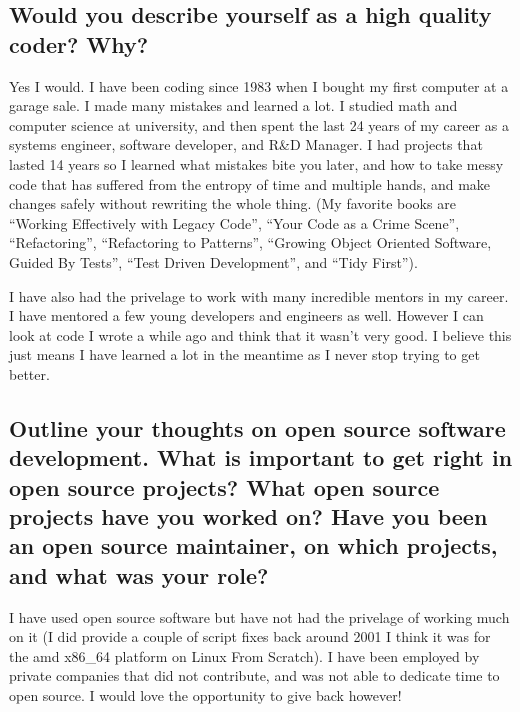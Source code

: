 \documentclass[letter,12pt]{article}
\begin{document}
\subsection{Would you describe yourself as a high quality coder? Why?}
Yes I would. I have been coding since 1983 when I bought my first computer at a garage sale. I made many mistakes and learned a lot. I studied math and computer science at university, and then spent the last 24 years of my career as a systems engineer, software developer, and R\&D Manager. I had projects that lasted 14 years so I learned what mistakes bite you later, and how to take messy code that has suffered from the entropy of time and multiple hands, and make changes safely without rewriting the whole thing. (My favorite books are ``Working Effectively with Legacy Code'', ``Your Code as a Crime Scene'', ``Refactoring'', ``Refactoring to Patterns'', ``Growing Object Oriented Software, Guided By Tests'', ``Test Driven Development'', and ``Tidy First'').

I have also had the privelage to work with many incredible mentors in my career. I have mentored a few young developers and engineers as well. However I can look at code I wrote a while ago and think that it wasn't very good. I believe this just means I have learned a lot in the meantime as I never stop trying to get better.

\subsection{Outline your thoughts on open source software development. What is important to get right in open source projects? What open source projects have you worked on? Have you been an open source maintainer, on which projects, and what was your role?}
I have used open source software but have not had the privelage of working much on it (I did provide a couple of script fixes back around 2001 I think it was for the amd x86\_64 platform on Linux From Scratch). I have been employed by private companies that did not contribute, and was not able to dedicate time to open source. I would love the opportunity to give back however!
\end{document}
